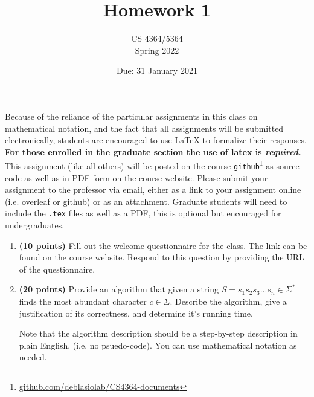 \documentclass[11pt, oneside]{article}   	%
\title{Homework 1}
\author{CS 4364/5364\\Spring 2022}
\date{Due: 31 January 2021}							%
\begin{document}
\maketitle

Because of the reliance of the particular assignments in this class on mathematical notation, 
and the fact that all assignments will be submitted electronically, 
students are encouraged to use \LaTeX{} to formalize their responses. 
\textbf{For those enrolled in the graduate section the use of latex is \emph{required}.}
This assignment (like all others) will be posted on the course \texttt{github}\footnote{\url{github.com/deblasiolab/CS4364-documents}} as source code as well as in PDF form on the course website. 
Please submit your assignment to the professor via email, either as a link to your assignment online (i.e. overleaf or github) or as an attachment. 
Graduate students will need to include the \texttt{.tex} files as well as a PDF, this is optional but encouraged for undergraduates. 

\begin{enumerate}
\item \textbf{(10 points)} 
Fill out the welcome questionnaire for the class. 
The link can be found on the course website. 
Respond to this question by providing the URL of the questionnaire.


\item \textbf{(20 points)} 
Provide an algorithm that given a string $S=s_1s_2s_3...s_n \in \Sigma^*$ finds the most abundant character $c\in\Sigma$. 
Describe the algorithm, give a justification of its correctness, and determine it's running time.

Note that the algorithm description should be a step-by-step description in plain English. (i.e. no psuedo-code). 
You can use mathematical notation as needed.  
\end{enumerate}
\end{document}
